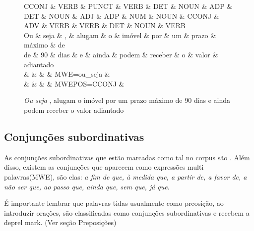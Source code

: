 \documentclass[output=paper,colorlinks,citecolor=brown]{langscibook}
\begin{document}
\begin{figure*}[htbp]
			\centering
			\vspace{.8cm}
			\begin{dependency}
				\begin{deptext}
					CCONJ \& VERB \& PUNCT \& VERB \& DET \& NOUN \& ADP \& DET \& NOUN \& ADJ \& ADP \& NUM \& 					NOUN \& CCONJ \& ADV \& VERB \& VERB \& DET \& NOUN \& VERB \\
					Ou \& seja \& , \& alugam \& o \& imóvel \& por \& um \& prazo \& máximo \& de \\
					de \& 90 \& dias \& e \& ainda \& podem \& receber \& o \& valor \& adiantado \\
					\& \& \& \& MWE=ou\_seja \& \\
					\& \& \& \& MWEPOS=CCONJ \& \\
				\end{deptext}

				
			\end{dependency}
			\caption{ \emph{Ou seja} , alugam o imóvel por um prazo máximo de 90 dias e ainda podem receber o valor adiantado}
			\label{dep:ousejaMWE2}
		\end{figure*}




\subsection{Conjunções subordinativas}

As conjunções subordinativas que estão marcadas como tal no corpus são \emph{}. Além disso, existem as conjunções que aparecem como expressões multi palavras(MWE), são elas: \emph{a fim de que, à medida que, a partir de, a favor de, a não ser que, ao passo que, ainda que, sem que, já que}. 

É importante lembrar que palavras tidas usualmente como preosição, ao introduzir orações, são classificadas como conjunções subordinativas e recebem a deprel mark. (Ver seção Preposições)
\end{document}
